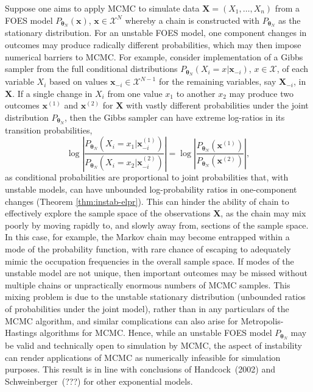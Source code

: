 \documentclass[12pt]{article}
\theoremstyle{definition}
\begin{document}
{Suppose one aims to apply MCMC to simulate data
\(\boldsymbol X=(X_1,\ldots,X_n)\) from a FOES model
\(P_{\boldsymbol \theta_N}(\boldsymbol x)\),
\(\boldsymbol x \in\mathcal{X}^N\) whereby a chain is constructed with
\(P_{\boldsymbol \theta_N}\) as the stationary distribution. For an
unstable FOES model, one component changes in outcomes may produce
radically different probabilities, which may then impose numerical barriers
to MCMC. For example, consider implementation of a Gibbs sampler from
the full conditional distributions
\(P_{\boldsymbol \theta_N} (X_i = x| \boldsymbol x_{-i})\),
\(x\in\mathcal{X}\), of each variable \(X_i\) based on values
\(\boldsymbol x_{-i}\in \mathcal{X}^{N-1}\) for the remaining variables,
say \(\boldsymbol X_{-i}\), in \(\boldsymbol X\). If a single change in
\(X_i\) from one value \(x_1\) to another \(x_2\) may produce two
outcomes \(\boldsymbol x^{(1)}\) and \(\boldsymbol x^{(2)}\) for
\(\boldsymbol X\) with vastly different probabilities under the joint
distribution \(P_{\boldsymbol \theta_N}\), then the Gibbs sampler can
have extreme log-ratios in its transition probabilities, \[
\log \left| \frac{P_{\boldsymbol \theta_N} (X_i =x_1 | \boldsymbol x^{(1)}_{-i})}{P_{\boldsymbol \theta_N} (X_i = x_2| \boldsymbol x^{(2)}_{-i}) } \right|=\log \left| \frac{P_{\boldsymbol \theta_N} ( \boldsymbol x^{(1)} )}{P_{\boldsymbol \theta_N} (  \boldsymbol x^{(2)} ) } \right|,
\]  as conditional probabilities are proportional to joint
probabilities that, with unstable models, can have unbounded
log-probability ratios in one-component changes (Theorem
\ref{thm:instab-elpr}). This can hinder the ability of chain to
effectively explore the sample space of the observations
\(\boldsymbol X\), as the chain may mix poorly by moving rapidly
to, and slowly away from, sections of the sample space.
In this case, for example, the Markov chain may become entrapped within a mode
of the probability function, with rare chance  of escaping to adequately mimic
the occupation frequencies in the overall sample space.
If modes of the unstable model are not unique, then important outcomes may be missed
without multiple chains or unpractically enormous numbers of    MCMC samples.
This
mixing problem is due to the unstable stationary distribution (unbounded
ratios of probabilities under the joint model), rather than in any
particulars of the MCMC algorithm, and similar complications can also arise
for Metropolis-Hastings algorithms for MCMC. Hence, while an unstable
FOES model \(P_{\boldsymbol \theta_N}\) may be valid and technically
open to simulation by MCMC, the aspect of instability
can render applications of MCMC as numerically infeasible for simulation purposes.
This result is in line with conclusions of Handcock~(2002) and Schweinberger~(???) for other exponential models.






}
\end{document}
